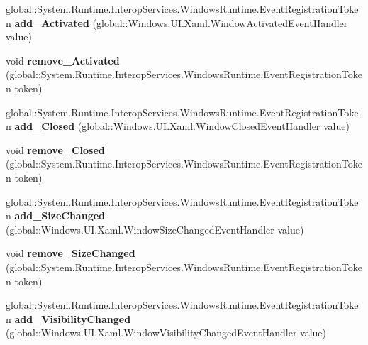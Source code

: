 \begin{DoxyCompactItemize}
global\+::\+System.\+Runtime.\+Interop\+Services.\+Windows\+Runtime.\+Event\+Registration\+Token {\bfseries add\+\_\+\+Activated} (global\+::\+Windows.\+U\+I.\+Xaml.\+Window\+Activated\+Event\+Handler value)
\item 
\mbox{\label{class_windows_1_1_u_i_1_1_xaml_1_1_window_a3d1b79b4484e987c7e8e39d71b41c7f6}} 
void {\bfseries remove\+\_\+\+Activated} (global\+::\+System.\+Runtime.\+Interop\+Services.\+Windows\+Runtime.\+Event\+Registration\+Token token)
\item 
\mbox{\label{class_windows_1_1_u_i_1_1_xaml_1_1_window_adb7cdb439992e4bd48b89f73f5654c16}} 
global\+::\+System.\+Runtime.\+Interop\+Services.\+Windows\+Runtime.\+Event\+Registration\+Token {\bfseries add\+\_\+\+Closed} (global\+::\+Windows.\+U\+I.\+Xaml.\+Window\+Closed\+Event\+Handler value)
\item 
\mbox{\label{class_windows_1_1_u_i_1_1_xaml_1_1_window_af4dfd22097abcbe56cc5002bf87ef515}} 
void {\bfseries remove\+\_\+\+Closed} (global\+::\+System.\+Runtime.\+Interop\+Services.\+Windows\+Runtime.\+Event\+Registration\+Token token)
\item 
\mbox{\label{class_windows_1_1_u_i_1_1_xaml_1_1_window_a883a42ba036296bce22db4dd54a0e00b}} 
global\+::\+System.\+Runtime.\+Interop\+Services.\+Windows\+Runtime.\+Event\+Registration\+Token {\bfseries add\+\_\+\+Size\+Changed} (global\+::\+Windows.\+U\+I.\+Xaml.\+Window\+Size\+Changed\+Event\+Handler value)
\item 
\mbox{\label{class_windows_1_1_u_i_1_1_xaml_1_1_window_a5241aefc4f3d8ef6c34cb6aeaef63884}} 
void {\bfseries remove\+\_\+\+Size\+Changed} (global\+::\+System.\+Runtime.\+Interop\+Services.\+Windows\+Runtime.\+Event\+Registration\+Token token)
\item 
\mbox{\label{class_windows_1_1_u_i_1_1_xaml_1_1_window_afb2f2c85c54f1a082f2cdb9cac5b875c}} 
global\+::\+System.\+Runtime.\+Interop\+Services.\+Windows\+Runtime.\+Event\+Registration\+Token {\bfseries add\+\_\+\+Visibility\+Changed} (global\+::\+Windows.\+U\+I.\+Xaml.\+Window\+Visibility\+Changed\+Event\+Handler value)

\end{DoxyCompactItemize}
